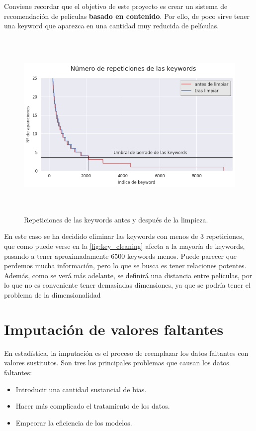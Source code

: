 Conviene recordar que el objetivo de este proyecto es crear un sistema de recomendación de películas \textbf{basado en contenido}. Por ello, de poco sirve tener una keyword que aparezca en una cantidad muy reducida de películas.

\begin{figure}[H]
    \centering
    \captionsetup{width=12cm}
    \includegraphics[height=9.3cm]{./contenido/imagenes/keyword_cleaning.png}
\caption{Repeticiones de las keywords antes y después de la limpieza.}
\label{fig:key_cleaning}
\end{figure}

En este caso se ha decidido eliminar las keywords con menos de $3$ repeticiones, que como puede verse en la \autoref{fig:key_cleaning} afecta a la mayoría de keywords, pasando a tener aproximadamente $6500$ keywords menos. Puede parecer que perdemos mucha información, pero lo que se busca es tener relaciones potentes. Además, como se verá más adelante, se definirá una distancia entre películas, por lo que no es conveniente tener demasiadas dimensiones, ya que se podría tener el problema de la dimensionalidad \cite{wiki:CurseOfDimensionality}

\newpage
\section{Imputación de valores faltantes}

En estadística, la imputación es el proceso de reemplazar los datos faltantes con valores sustitutos. Son tres los principales problemas que causan los datos faltantes:
\begin{itemize}
    \item Introducir una cantidad sustancial de bias.
    \item Hacer más complicado el tratamiento de los datos.
    \item Empeorar la eficiencia de los modelos.
\end{itemize}

